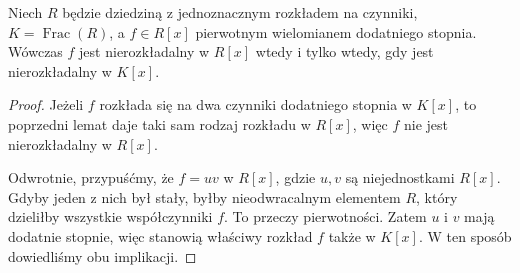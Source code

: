 \begin{twierdzenie}
\label{aa:tw:gauss-irreducibility}
Niech $R$ będzie dziedziną z jednoznacznym rozkładem
na czynniki, $K=\operatorname{Frac}(R)$, a
$f\in R[x]$ pierwotnym wielomianem dodatniego stopnia.
Wówczas $f$ jest nierozkładalny w $R[x]$ wtedy i tylko
wtedy, gdy jest nierozkładalny w $K[x]$.
\end{twierdzenie}
\begin{proof}
Jeżeli $f$ rozkłada się na dwa czynniki dodatniego stopnia
w $K[x]$, to poprzedni lemat daje taki sam rodzaj rozkładu
w $R[x]$, więc $f$ nie jest nierozkładalny w $R[x]$.

Odwrotnie, przypuśćmy, że $f=uv$ w $R[x]$, gdzie
$u,v$ są niejednostkami $R[x]$. Gdyby jeden z nich
był stały, byłby nieodwracalnym elementem $R$, który
dzieliłby wszystkie współczynniki $f$. To przeczy
pierwotności. Zatem $u$ i $v$ mają dodatnie stopnie,
więc stanowią właściwy rozkład $f$ także w $K[x]$.
W ten sposób dowiedliśmy obu implikacji.
\end{proof}


